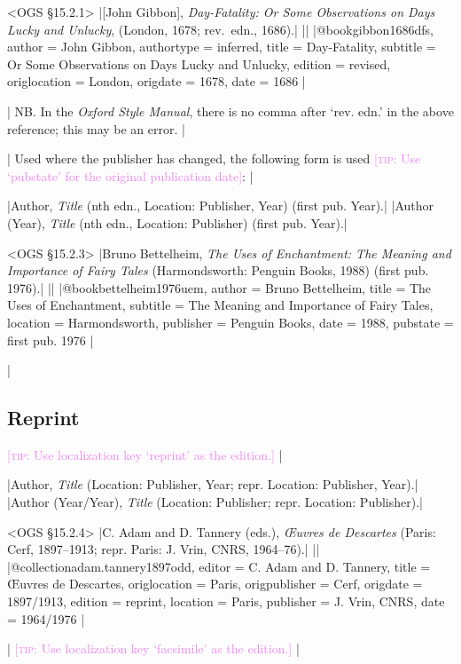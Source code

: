 \documentclass[extrafontsizes,11pt,a4paper,oneside]{memoir}
\newcommand*{\lit}[1]{\textsf{#1}}
\newcommand*{\code}[1]{`\textsf{#1}'}
\newcommand*{\aside}[1]{\textcolor{violet}{[\textsc{tip:} #1]}}
\begin{document}
\bibexample<OGS \S15.2.1>
|{[John Gibbon]}, \emph{Day-Fatality: Or Some Observations on Days Lucky and Unlucky}, (London, 1678; rev.~edn., 1686).|%
||%
|@book{gibbon1686dfs,
  author = {John Gibbon},
  authortype = {inferred},
  title = {Day-Fatality},
  subtitle = {Or Some Observations on Days Lucky and Unlucky},
  edition = {revised},
  origlocation = {London},
  origdate = {1678},
  date = {1686}
}|
  
\todoc[oxnotes]|
NB. In the \emph{Oxford Style Manual}, there is no comma after ‘rev. edn.’ in the above reference; this may be an error.
|

\todoc|
Used where the publisher has changed, the following form is used \aside{Use \code{pubstate} for the original publication date}:
|

\specs
|Author, \emph{Title} (nth \lit{edn.}, Location: Publisher, Year) (\lit{first pub.} Year).|%
|Author (Year), \emph{Title} (nth \lit{edn.}, Location: Publisher) (\lit{first pub.} Year).|

\bibexample<OGS \S15.2.3>
|Bruno Bettelheim, \emph{The Uses of Enchantment: The Meaning and Importance of Fairy Tales} (Harmondsworth: Penguin Books, 1988) (first pub. 1976).|%
||%
|@book{bettelheim1976uem,
  author = {Bruno Bettelheim},
  title = {The Uses of Enchantment},
  subtitle = {The Meaning and Importance of Fairy Tales},
  location = {Harmondsworth},
  publisher = {Penguin Books},
  date = {1988},
  pubstate = {first pub\adddotspace 1976}
}|
  
\todoc|
\subsection{Reprint}

\aside{Use localization key \code{reprint} as the edition.}
|

\specs
|Author, \emph{Title} (Location: Publisher, Year; \lit{repr.} Location: Publisher, Year).|%
|Author (Year/Year), \emph{Title} (Location: Publisher; \lit{repr.} Location: Publisher).|

\bibexample<OGS \S15.2.4>
|C. Adam and D. Tannery (eds.), \emph{Œuvres de Descartes} (Paris: Cerf, 1897--1913; repr. Paris: J. Vrin, CNRS, 1964--76).|%
||%
|@collection{adam.tannery1897odd,
  editor = {C. Adam and D. Tannery},
  title = {Œuvres de Descartes},
  origlocation = {Paris},
  origpublisher = {Cerf},
  origdate = {1897/1913},
  edition = {reprint},
  location = {Paris},
  publisher = {J. Vrin, CNRS},
  date = {1964/1976}
}|

\todoc|
\aside{Use localization key \code{facsimile} as the edition.}
|
\end{document}
